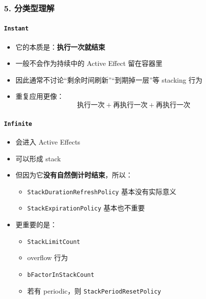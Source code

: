 \documentclass[CJKmath=true,10pt]{MyBook}
\begin{document}
\subsubsection{5. 分类型理解}

\paragraph{\texttt{Instant}}
\begin{itemize}
	\item 它的本质是：\textbf{执行一次就结束}
	\item 一般不会作为持续中的 Active Effect 留在容器里
	\item 因此通常不讨论“剩余时间刷新”“到期掉一层”等 stacking 行为
	\item 重复应用更像：
	\[
	\text{执行一次} + \text{再执行一次} + \text{再执行一次}
	\]
\end{itemize}

\paragraph{\texttt{Infinite}}
\begin{itemize}
	\item 会进入 Active Effects
	\item 可以形成 stack
	\item 但因为它\textbf{没有自然倒计时结束}，所以：
	\begin{itemize}
		\item \texttt{StackDurationRefreshPolicy} 基本没有实际意义
		\item \texttt{StackExpirationPolicy} 基本也不重要
	\end{itemize}
	\item 更重要的是：
	\begin{itemize}
		\item \texttt{StackLimitCount}
		\item overflow 行为
		\item \texttt{bFactorInStackCount}
		\item 若有 periodic，则 \texttt{StackPeriodResetPolicy}
	\end{itemize}
\end{itemize}
\end{document}
